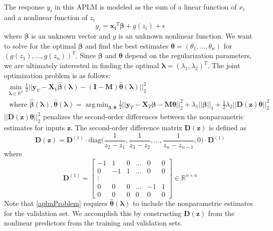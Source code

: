 \documentclass[10pt,letterpaper]{article}
\DeclareMathOperator*{\argmin}{arg\,min}
\begin{document}
The response $y_i$ in this APLM is modeled as the sum of a linear function of $x_i$ and a nonlinear function of $z_i$
\begin{equation}
y_i = \boldsymbol{x_i}^T \boldsymbol{\beta} + g(z_i) + \epsilon
\end{equation}
where $\boldsymbol \beta$ is an unknown vector and $g$ is an unknown nonlinear function. We want to solve for the optimal $\boldsymbol{\beta}$ and find the best estimates $\boldsymbol{\theta} = (\theta_1, ..., \theta_n)$ for $(g(z_1), ..., g(z_n))^T$. Since $\boldsymbol{\beta}$ and $\boldsymbol{\theta}$ depend on the regularization parameters, we are ultimately interested in finding the optimal $\boldsymbol\lambda = (\lambda_1, \lambda_2)^T$. The joint optimization problem is as follows:
\begin{equation}
\begin{array}{c}
\min_{\boldsymbol\lambda \in \mathbb{R}^2} \frac{1}{2}
\bigl\lvert\bigl\lvert
\boldsymbol{y}_V
- \boldsymbol{X}_V\hat{\boldsymbol{\beta}}(\boldsymbol{\lambda})
- (\boldsymbol{I} - \boldsymbol{M}) \hat{\boldsymbol{\theta}}(\boldsymbol{\lambda})
\bigl\rvert\bigl\rvert^2_2 \\
\text{ where }
\hat{\boldsymbol{\beta}}(\boldsymbol{\lambda}),
\hat{\boldsymbol{\theta}}(\boldsymbol{\lambda}) =
\argmin_{\boldsymbol{\beta}, \boldsymbol{\theta}}
\frac{1}{2} \bigl\lvert\bigl\lvert
\boldsymbol{y}_T
- \boldsymbol{X}_T\boldsymbol{\beta}
- \boldsymbol{M} \boldsymbol{\theta} \bigl\rvert\bigl\rvert^2_2
+ \lambda_1 \lvert\lvert \boldsymbol{\beta}
\rvert \rvert_1
+ \frac{1}{2} \lambda_2 \lvert\lvert \boldsymbol{D}(\boldsymbol{z}) \boldsymbol{\theta} \rvert \rvert_2^2
\end{array}
\label{aplmProblem}
\end{equation}
$\lvert\lvert \boldsymbol{D}(\boldsymbol{z}) \boldsymbol{\theta} \rvert \rvert_2^2$ penalizes the second-order differences between the nonparametric estimates for inputs $\boldsymbol{z}$. The second-order difference matrix $\boldsymbol{D}(\boldsymbol{z})$ is defined as
\begin{equation}
\boldsymbol{D}(\boldsymbol{z}) = \boldsymbol{D}^{(1)} \cdot
\text{diag} \big ( \frac{1}{z_{2} - z_1}, \frac{1}{z_{3} - z_2}, ... , \frac{1}{z_{n} - z_{n-1}}, 0 \big )
\cdot \boldsymbol{D}^{(1)}
\end{equation}
where
\begin{equation}
\boldsymbol{D}^{(1)} = 
\begin{bmatrix}
-1 & 1 & 0 & ... & 0 & 0 \\
0 & -1 & 1 & ... & 0 & 0 \\
\vdots \\
0 & 0 & 0 & ... & -1 & 1 \\
0 &0 & 0 &  0  &  0 & 0
\end{bmatrix}
\in
\mathbb{R}^{n\times n}
\end{equation}
Note that \eqref{aplmProblem} requires $\hat{\boldsymbol{\theta}}(\boldsymbol{\lambda})$ to include the nonparametric estimates for the validation set. We accomplish this by constructing $\boldsymbol{D}(\boldsymbol{z})$ from the nonlinear predictors from the training and validation sets.
\end{document}
